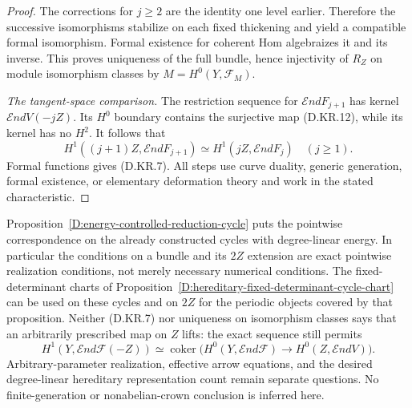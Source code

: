 \begin{proof}
The corrections for $j\ge2$ are the identity one level
earlier. Therefore the successive isomorphisms stabilize on
each fixed thickening and yield a compatible formal
isomorphism. Formal existence for coherent Hom algebraizes
it and its inverse. This proves uniqueness of the full
bundle, hence injectivity of $R_Z$ on module isomorphism
classes by $M=H^0(Y,\mathcal F_M)$.

\emph{The tangent-space comparison.}
The restriction sequence for $\mathcal End F_{j+1}$ has
kernel $\mathcal End V(-jZ)$. Its $H^0$ boundary contains
the surjective map (D.KR.12), while its kernel has no $H^2$.
It follows that
\[
 H^1((j+1)Z,\mathcal End F_{j+1})
             \simeq H^1(jZ,\mathcal End F_j)
 \quad(j\ge1).
\]
Formal functions gives (D.KR.7). All steps use curve duality,
generic generation, formal existence, or elementary
deformation theory and work in the stated characteristic.
\end{proof}

\begin{remark}
Proposition~\ref{D:energy-controlled-reduction-cycle} puts the
pointwise correspondence on the already constructed cycles
with degree-linear energy. In particular the conditions on a
bundle and its $2Z$ extension are exact pointwise realization
conditions, not merely necessary numerical conditions.
The fixed-determinant charts of
Proposition~\ref{D:hereditary-fixed-determinant-cycle-chart}
can be used on these cycles and on $2Z$ for the periodic
objects covered by that proposition.
Neither (D.KR.7) nor uniqueness on isomorphism classes says
that an arbitrarily prescribed map on $Z$ lifts: the exact
sequence still permits
\[
 H^1(Y,\mathcal End\mathcal F(-Z))
   \simeq\operatorname{coker}\bigl(
 H^0(Y,\mathcal End\mathcal F)\to
 H^0(Z,\mathcal End V)\bigr).
\]
Arbitrary-parameter realization, effective arrow equations,
and the desired degree-linear hereditary representation
count remain separate questions. No finite-generation or
nonabelian-crown conclusion is inferred here.
\end{remark}
